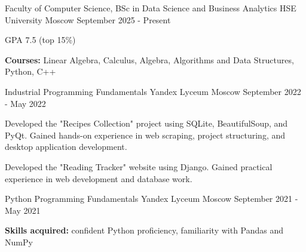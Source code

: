 

\begin{cventries}

  \cventry
    {Faculty of Computer Science, BSc in Data Science and Business Analytics} %
    {HSE University} %
    {Moscow} %
    {September 2025 - Present} %
    {
      \begin{cvitems} %
        \item {GPA 7.5 (top 15\%)}
        \item {\textbf{Courses:} Linear Algebra, Calculus, Algebra, Algorithms and Data Structures, Python, C++}
      \end{cvitems}
    }

  \cventry
    {Industrial Programming Fundamentals} %
    {Yandex Lyceum} %
    {Moscow} %
    {September 2022 - May 2022} %
    {
      \begin{cvitems} %
        \item {Developed the "Recipes Collection" project using SQLite, BeautifulSoup, and PyQt. Gained hands-on experience in web scraping, project structuring, and desktop application development.}
        \item {Developed the "Reading Tracker" website using Django. Gained practical experience in web development and database work.}
      \end{cvitems}
    }

  \cventry
    {Python Programming Fundamentals} %
    {Yandex Lyceum} %
    {Moscow} %
    {September 2021 - May 2021} %
    {
      \begin{cvitems} %
        \item {\textbf{Skills acquired:} confident Python proficiency, familiarity with Pandas and NumPy}
      \end{cvitems}
    }

\end{cventries}
